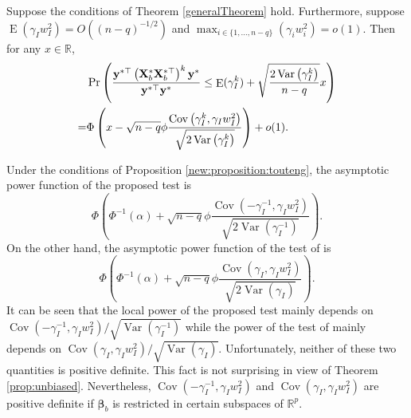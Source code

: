 \documentclass[smallextended]{svjour3}       %
\DeclareMathOperator{\myE}{E}
\DeclareMathOperator{\myVar}{Var}
\DeclareMathOperator{\myCov}{Cov}
\newcommand{\By}{\mathbf{y}}    \newcommand{\Bz}{\mathbf{z}}
\newcommand{\bfsym}[1]{\ensuremath{\boldsymbol{#1}}}
\def\bbeta{\bfsym \beta}
\begin{document}
\begin{proposition}
    Suppose the conditions of Theorem \ref{generalTheorem} hold.
    Furthermore, suppose $\myE (\gamma_I w_I^2) = O((n-q)^{-1/2})$ and $\max_{i\in \{1, \dots, n-q\}} (\gamma_i w_i^2) = o(1)$.
Then for any $x\in \mathbb R$,
\begin{equation*}
    \begin{split}
    &\Pr\left( 
        \frac{
            \By^{*\top} \left( \BX_b^* \BX_b^{*\top} \right)^k \By^*
        }{
            \By^{*\top} \By^*
        } 
        \leq 
        \myE (\gamma_I^k)
        +\sqrt{
            \frac{2\myVar\left( \gamma_I^k \right)}{n-q} 
        }
        x
    \right) 
    \\
    =&
    \Phi\left( 
        x- \sqrt{n-q} \phi
            \frac{
            \myCov\left( \gamma_I^k, \gamma_I w_I^2 \right)
            }{
\sqrt{2 \myVar\left( \gamma_I^k \right)}
}
    \right)
    +o(1)
    .
    \end{split}
\end{equation*}
    \label{new:proposition:touteng}
\end{proposition}
Under the conditions of Proposition \ref{new:proposition:touteng}, the asymptotic power function of the proposed test is
\begin{equation*}
    \Phi\left(
        \Phi^{-1}(\alpha) + \sqrt{n-q} \phi  \frac{\myCov(-\gamma_I^{-1}, \gamma_I w_I^2)}{ \sqrt{2\myVar(\gamma_I^{-1})}}
    \right) 
    .
\end{equation*}
On the other hand, the asymptotic power function of the test of \cite{Goeman2006} is
\begin{equation*}
    \Phi\left(
        \Phi^{-1}(\alpha) + \sqrt{n-q} \phi  \frac{\myCov(\gamma_I, \gamma_I w_I^2)}{\sqrt{2\myVar(\gamma_I)}}
    \right) 
    .
\end{equation*}
It can be seen that the local power of the proposed test mainly depends on $\myCov (-\gamma_I^{-1}, \gamma_I w_I^2)/\sqrt{\myVar(\gamma_I^{-1})}$ while the power of the test of \cite{Goeman2006} mainly depends on $\myCov(\gamma_I, \gamma_I w_I^2) / \sqrt{\myVar(\gamma_I)}$.  
Unfortunately, neither of these two quantities is positive definite.
This fact is not surprising in view of Theorem \ref{prop:unbiased}.
Nevertheless, $\myCov (-\gamma_I^{-1}, \gamma_I w_I^2)$ and $\myCov(\gamma_I, \gamma_I w_I^2)$ are positive definite if $\bbeta_b$ is restricted  in certain subspaces of $\mathbb R^p$.
\end{document}
